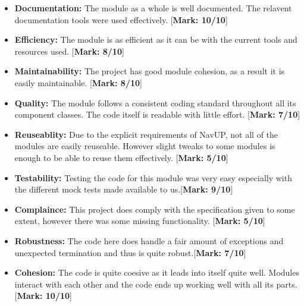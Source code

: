 \documentclass[runningheads,a4paper]{article}
\begin{document}
	\begin{itemize}
		\item \textbf{Documentation:}
			The module as a whole is well documented. The relavent documentation tools were used effectively. [\textbf{Mark: 10/10}]
			
		\item \textbf{Efficiency:} The module is as efficient as it can be with the current tools and resources used. [\textbf{Mark: 8/10}]
		
		\item \textbf{Maintainability:} The project has good module cohesion, as a result it is easily maintainable. [\textbf{Mark: 8/10}]
		
		\item \textbf{Quality:} The module follows a consistent coding standard throughout all its component classes. The code itself is readable with little effort. [\textbf{Mark: 7/10}]
		
		\item \textbf{Reuseablity:} Due to the explicit requirements of NavUP, not all of the modules are easily reuseable. However slight tweaks to some modules is enough to be able to reuse them effectively. [\textbf{Mark: 5/10}]
		
		\item \textbf{Testability:} Testing the code for this module was very easy especially with the different mock tests made available to us.[\textbf{Mark: 9/10}]
	
		\item \textbf{Complaince:} This project does comply with the specification given to some extent, however there was some missing functionality. [\textbf{Mark: 5/10}]
	
		\item \textbf{Robustness:} The code here does handle a fair amount of exceptions and unexpected termination and thus is quite robust.[\textbf{Mark: 7/10}]

		\item \textbf{Cohesion:} The code is quite coesive as it leads into itself quite well. Modules interact with each other and the code ends up working well with all its parts.[\textbf{Mark: 10/10}]\\

		
	\end{itemize}
	
	

\end{document}

